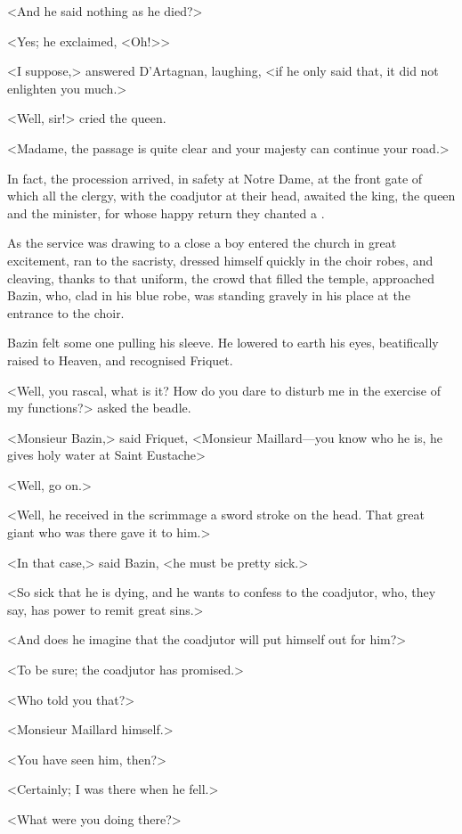 <And he said nothing as he died?>

<Yes; he exclaimed, <Oh!>>

<I suppose,> answered D'Artagnan, laughing, <if he only said that, it did not enlighten you much.>

<Well, sir!> cried the queen.

<Madame, the passage is quite clear and your majesty can continue your road.>

In fact, the procession arrived, in safety at Notre Dame, at the front gate of which all the clergy, with the coadjutor at their head, awaited the king, the queen and the minister, for whose happy return they chanted a .

As the service was drawing to a close a boy entered the church in great excitement, ran to the sacristy, dressed himself quickly in the choir robes, and cleaving, thanks to that uniform, the crowd that filled the temple, approached Bazin, who, clad in his blue robe, was standing gravely in his place at the entrance to the choir.

Bazin felt some one pulling his sleeve. He lowered to earth his eyes, beatifically raised to Heaven, and recognised Friquet.

<Well, you rascal, what is it? How do you dare to disturb me in the exercise of my functions?> asked the beadle.

<Monsieur Bazin,> said Friquet, <Monsieur Maillard—you know who he is, he gives holy water at Saint Eustache\longdash>

<Well, go on.>

<Well, he received in the scrimmage a sword stroke on the head. That great giant who was there gave it to him.>

<In that case,> said Bazin, <he must be pretty sick.>

<So sick that he is dying, and he wants to confess to the coadjutor, who, they say, has power to remit great sins.>

<And does he imagine that the coadjutor will put himself out for him?>

<To be sure; the coadjutor has promised.>

<Who told you that?>

<Monsieur Maillard himself.>

<You have seen him, then?>

<Certainly; I was there when he fell.>

<What were you doing there?>

